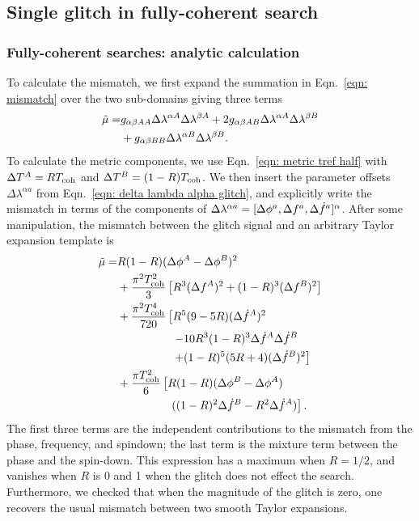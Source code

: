 \documentclass[../full_thesis/full_thesis.tex]{subfiles}
\begin{document}
\subsection{Single glitch in fully-coherent search}

\subsubsection{Fully-coherent searches: analytic calculation}

To calculate the mismatch, we first expand
the summation in Eqn.~\eqref{eqn: mismatch} over the two sub-domains giving three terms
\begin{align}
\begin{split}
\tilde{\mu} = &
g_{\alpha\beta AA}\Delta\lambda^{\alpha A} \Delta\lambda^{\beta A} +
2 g_{\alpha\beta AB}\Delta\lambda^{\alpha A} \Delta\lambda^{\beta B}\\
 &  + g_{\alpha\beta BB}\Delta\lambda^{\alpha B} \Delta\lambda^{\beta B}.
\end{split}
\end{align}
To calculate the metric components, we use Eqn.~\eqref{eqn: metric tref half}
with $\Delta T^A = RT_{\mathrm{coh}}$ and $\Delta T^B = (1-R)T_{\mathrm{coh}}$.
We then insert the parameter offsets $\Delta\lambda^{\alpha a}$
from Eqn.~\eqref{eqn: delta lambda alpha glitch},
and explicitly write the mismatch in terms of the components  of $\Delta\lambda^{\alpha a}=
[\Delta\phi^{a}, \Delta f^{a}, \Delta\dot{f}^{a}]^{\alpha}$.
After some manipulation, the mismatch between the glitch signal and an arbitrary
Taylor expansion template is
\begin{align}
\begin{split}
\mutilde = & R(1-R)(\Deltaphi^A - \Deltaphi^B)^{2} \\
& + \frac{\pi^{2}\Tcoh^{2}}{3}
\left[R^{3}(\Deltanu^A)^{2} + (1-R)^{3}  (\Deltanu^B)^{2}\right] \\
& + \frac{\pi^{2} \Tcoh^{4}}{720}\left[
       R^{5}(9-5R)(\Deltanudot^A)^{2} \right. \\
       & \hspace{17mm}\left.-10R^{3}(1-R)^{3}\Deltanudot^A\Deltanudot^B \right. \\
       & \hspace{17mm}\left. + (1-R)^{5}(5R+4)(\Deltanudot^B)^{2}
                                       \right] \\
& + \frac{\pi \Tcoh^{2}}{6}\left[R(1-R)
    (\Deltaphi^B - \Deltaphi^A)\right. \\
    & \hspace{16mm} \left.((1-R)^{2}\Deltanudot^B -  R^{2}\Deltanudot^A)
                                 \right].
\end{split}
\label{eqn: mutilde fully-coherent unminimised}
\end{align}
The first three terms are the independent contributions to the
mismatch from the phase, frequency, and spindown; the last term is the mixture
term between the phase and the spin-down.  This expression has a maximum
when $R = 1/2$, and vanishes when $R$ is 0 and 1 when the glitch does not effect the
search. Furthermore, we checked that when the magnitude of the glitch is zero,
one recovers the usual mismatch between two smooth Taylor expansions.
\end{document}
